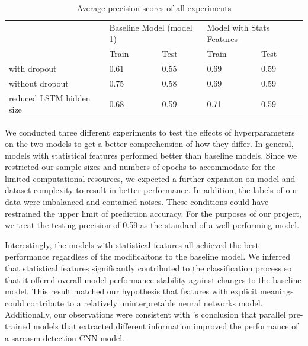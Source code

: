 \documentclass[12pt]{diazessay} %
\begin{document}
{\begin{table}[h!]
    \centering
    \begin{tabular}{|l|l|l|l|l|}
    \hline
    \multirow{2}{*}{}        & \multicolumn{2}{l|}{Baseline Model (model 1)} & \multicolumn{2}{l|}{Model with Stats Features} \\ \cline{2-5} 
                             & Train                  & Test                 & Train                  & Test                  \\ \hline
    with dropout             & 0.61                   & 0.55                 & 0.69                   & 0.59                  \\ \hline
    without dropout          & 0.75                   & 0.58                 & 0.69                   & 0.59                  \\ \hline
    reduced LSTM hidden size & 0.68                   & 0.59                 & 0.71                   & 0.59                  \\ \hline
    \end{tabular}
    \caption{Average precision scores of all experiments}
    \label{table:AP}
\end{table}

We conducted three different experiments to test the effects of hyperparameters on the two models to get a better comprehension of how they differ. In general, models with statistical features performed better than baseline models. Since we restricted our sample sizes and numbers of epochs to accommodate for the limited computational resources, we expected a further expansion on model and dataset complexity to result in better performance. In addition, the labels of our data were imbalanced and contained noises. These conditions could have restrained the upper limit of prediction accuracy. For the purposes of our project, we treat the testing precision of 0.59 as the standard of a well-performing model. 

Interestingly, the models with statistical features all achieved the best performance regardless of the modificaitons to the baseline model. We inferred that statistical features significantly contributed to the classification process so that it offered overall model performance stability against changes to the baseline model. This result matched our hypothesis that features with explicit meanings could contribute to a relatively uninterpretable neural networks model. Additionally, our observations were consistent with \citet{poria2017}'s conclusion that parallel pre-trained models that extracted different information improved the performance of a sarcasm detection CNN model. 

}
\end{document}
